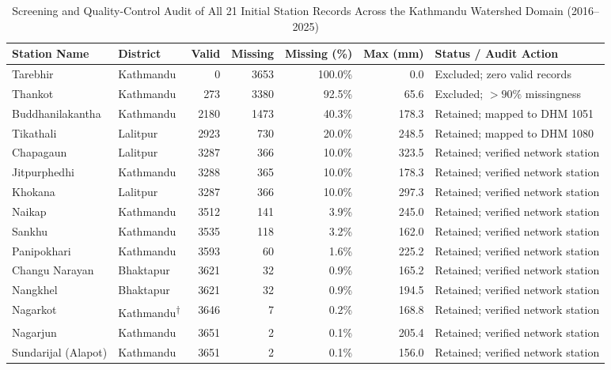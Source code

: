 \documentclass[conference]{IEEEtran}
\begin{document}
\begin{table}[!tbp]
\centering
\caption{Screening and Quality-Control Audit of All 21 Initial Station Records Across the Kathmandu Watershed Domain (2016--2025)}
\label{tab:audit}
\vspace{3pt}
{\footnotesize
\renewcommand{\arraystretch}{1.15}\setlength{\tabcolsep}{4.0pt}%
\begin{tabularx}{\textwidth}{|l|l|r|r|r|r|X|}
\hline
\textbf{Station Name} & \textbf{District} & \textbf{Valid} & \textbf{Missing} & \textbf{Missing (\%)} & \textbf{Max (mm)} & \textbf{Status / Audit Action} \\
\hline
Tarebhir & Kathmandu & 0 & 3653 & 100.0\% & 0.0 & Excluded; zero valid records \\ \hline
Thankot & Kathmandu & 273 & 3380 & 92.5\% & 65.6 & Excluded; $>90\%$ missingness \\ \hline
Buddhanilakantha & Kathmandu & 2180 & 1473 & 40.3\% & 178.3 & Retained; mapped to DHM 1051 \\ \hline
Tikathali & Lalitpur & 2923 & 730 & 20.0\% & 248.5 & Retained; mapped to DHM 1080 \\ \hline
Chapagaun & Lalitpur & 3287 & 366 & 10.0\% & 323.5 & Retained; verified network station \\ \hline
Jitpurphedhi & Kathmandu & 3288 & 365 & 10.0\% & 178.3 & Retained; verified network station \\ \hline
Khokana & Lalitpur & 3287 & 366 & 10.0\% & 297.3 & Retained; verified network station \\ \hline
Naikap & Kathmandu & 3512 & 141 & 3.9\% & 245.0 & Retained; verified network station \\ \hline
Sankhu & Kathmandu & 3535 & 118 & 3.2\% & 162.0 & Retained; verified network station \\ \hline
Panipokhari & Kathmandu & 3593 & 60 & 1.6\% & 225.2 & Retained; verified network station \\ \hline
Changu Narayan & Bhaktapur & 3621 & 32 & 0.9\% & 165.2 & Retained; verified network station \\ \hline
Nangkhel & Bhaktapur & 3621 & 32 & 0.9\% & 194.5 & Retained; verified network station \\ \hline
Nagarkot & Kathmandu\textsuperscript{$\dagger$} & 3646 & 7 & 0.2\% & 168.8 & Retained; verified network station \\ \hline
Nagarjun & Kathmandu & 3651 & 2 & 0.1\% & 205.4 & Retained; verified network station \\ \hline
Sundarijal (Alapot) & Kathmandu & 3651 & 2 & 0.1\% & 156.0 & Retained; verified network station \\ \hline

\end{tabularx}}
\end{table}
\end{document}
